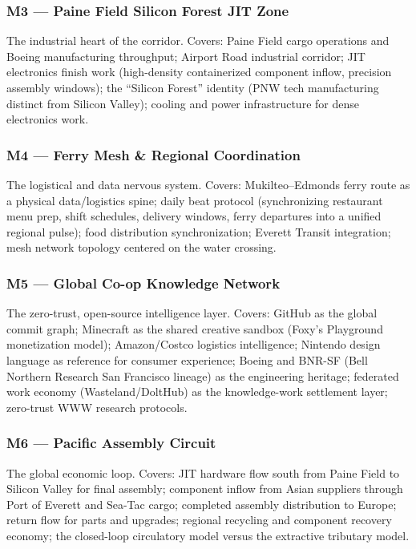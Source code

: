 \documentclass[11pt,letterpaper]{article}
\begin{document}
\subsubsection{M3 --- Paine Field Silicon Forest JIT Zone}
The industrial heart of the corridor. Covers: Paine Field cargo operations and Boeing manufacturing throughput; Airport Road industrial corridor; JIT electronics finish work (high-density containerized component inflow, precision assembly windows); the ``Silicon Forest'' identity (PNW tech manufacturing distinct from Silicon Valley); cooling and power infrastructure for dense electronics work.

\subsubsection{M4 --- Ferry Mesh \& Regional Coordination}
The logistical and data nervous system. Covers: Mukilteo--Edmonds ferry route as a physical data/logistics spine; daily beat protocol (synchronizing restaurant menu prep, shift schedules, delivery windows, ferry departures into a unified regional pulse); food distribution synchronization; Everett Transit integration; mesh network topology centered on the water crossing.

\subsubsection{M5 --- Global Co-op Knowledge Network}
The zero-trust, open-source intelligence layer. Covers: GitHub as the global commit graph; Minecraft as the shared creative sandbox (Foxy's Playground monetization model); Amazon/Costco logistics intelligence; Nintendo design language as reference for consumer experience; Boeing and BNR-SF (Bell Northern Research San Francisco lineage) as the engineering heritage; federated work economy (Wasteland/DoltHub) as the knowledge-work settlement layer; zero-trust WWW research protocols.

\subsubsection{M6 --- Pacific Assembly Circuit}
The global economic loop. Covers: JIT hardware flow south from Paine Field to Silicon Valley for final assembly; component inflow from Asian suppliers through Port of Everett and Sea-Tac cargo; completed assembly distribution to Europe; return flow for parts and upgrades; regional recycling and component recovery economy; the closed-loop circulatory model versus the extractive tributary model.
\end{document}
